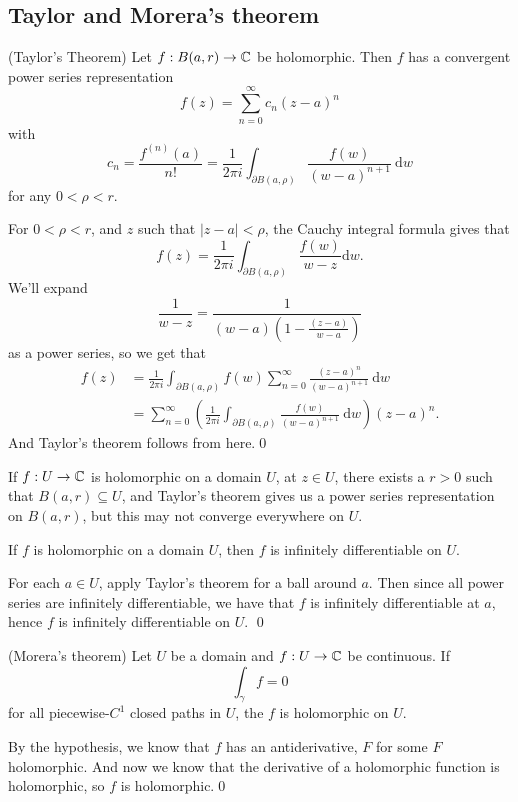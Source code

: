 \documentclass{article}
\begin{document}
\subsection{Taylor and Morera's theorem}
\begin{theorem}
	(Taylor's Theorem) Let $ f:B(a,r) \to \mathbb{C} $ be holomorphic. Then $ f $ has a convergent power series representation
	\[
		f(z) = \sum_{n=0}^\infty c_n(z-a)^n
	\]
	with
	\[
		c_n = \frac{f^{(n)}(a)}{n!} = \frac 1{2\pi i} \int_{\partial B(a,\rho)} \frac {f(w)}{(w-a)^{n+1}}\ \mathrm dw
	\]
	for any $ 0<\rho <r $.
\end{theorem}
\pf For $ 0<\rho <r $, and $ z $ such that $ |z-a|<\rho $, the Cauchy integral formula gives that
\[
	f(z) = \frac 1{2\pi i} \int_{\partial B(a,\rho)}\frac{f(w)}{w-z}\mathrm dw.
\]
We'll expand
\[
	\frac 1{w-z} = \frac 1{(w-a)\left(1-\frac{(z-a)}{w-a}\right)}
\]
as a power series, so we get that
\begin{align*}
	f(z) &= \frac 1{2\pi i} \int_{\partial B(a,\rho)}f(w)\sum_{n=0}^\infty \frac{(z-a)^n}{(w-a)^{n+1}}\ \mathrm dw\\
	     &= \sum_{n=0}^\infty \left(\frac 1{2\pi i} \int_{\partial B(a,\rho)} \frac{f(w)}{(w-a)^{n+1}}\ \mathrm dw\right)(z-a)^n.
\end{align*}
And Taylor's theorem follows from here.\qed
\begin{remark}
  If $ f:U\to \mathbb{C} $ is holomorphic on a domain $ U $, at $ z\in U $, there exists a $ r>0 $ such that $ B(a,r)\subseteq U $, and Taylor's theorem gives us a power series representation on $ B(a,r) $, but this may not converge everywhere on $ U $.
\end{remark}
\begin{corollary}
  If $ f $ is holomorphic on a domain $ U $, then $ f $ is infinitely differentiable on $ U $. 
\end{corollary}
\pf For each $ a\in U $, apply Taylor's theorem for a ball around $ a $. Then since all power series are infinitely differentiable, we have that $ f $ is infinitely differentiable at $ a $, hence $ f $ is infinitely differentiable on $ U $. \qed
\begin{theorem}
	(Morera's theorem) Let $ U $ be a domain and $ f:U\to\mathbb{C} $ be continuous. If
	\[
	  \int_\gamma f = 0
	\]
	for all piecewise-$ C^1 $ closed paths in $ U $, the $ f $ is holomorphic on $ U $.
\end{theorem}
\pf By the hypothesis, we know that $ f $ has an antiderivative, $ F $ for some $ F $ holomorphic. And now we know that the derivative of a holomorphic function is holomorphic, so $ f $ is holomorphic.\qed 
\end{document}
